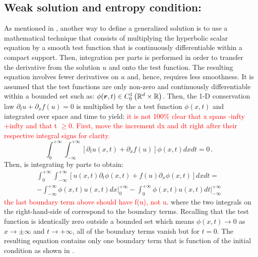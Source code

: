 \subsection{Weak solution and entropy condition:}\label{weak_sct1b}
As mentioned in , another way to define a generalized solution is to use a mathematical technique that consists of multiplying the hyperbolic scalar equation by a smooth test function that is continuously differentiable within a compact support. Then, integration per parts is performed in order to transfer the derivative from the solution $u$ and onto the test function. The resulting equation involves fewer derivatives on $u$ and, hence, requires less smoothness. It is assumed that the test functions are only non-zero and continuously differentiable within a bounded set such as: $\phi(\boldsymbol r,t) \in C_0^1 \left( \mathbb{R}^d \times \mathbb{R} \right)$. 
Then, the 1-D conservation law $\partial_t u + \partial_x f(u) = 0$ is multiplied by the a test function $\phi(x,t)$ and integrated over space and time to yield:
\textcolor{red}{it is not 100\% clear that x spans -infty +infty and that t $\ge 0$. First, move the increment dx and dt right after their respective integral signs for clarity.}%
\begin{equation}\label{eq:weak_sol_sct1b}
\int_0^{+\infty}\int_{-\infty}^{+\infty} \left[ \partial_t u(x,t) + \partial_x f(u) \right] \phi(x,t) dx dt = 0 \,.
\end{equation}
% 
Then,  is integrating by parts to obtain:
%
\begin{eqnarray}\label{eq:weak_sol2_sct1b}
\int_0^{+\infty}\int_{-\infty}^{+\infty} \left[ u(x,t) \partial_t \phi(x,t)   + f(u) \partial_x \phi(x,t)  \right] dx dt = \nonumber \\
-\int_{-\infty}^{+\infty} \phi(x,t) u(x,t) dx \left. \right|_0^{+\infty} - \int_0^{+\infty} \phi(x,t) u(x,t) dt \left. \right|_{-\infty}^{+\infty}
\end{eqnarray}
%
\textcolor{red}{the last boundary term above should have f(u), not u}.
where the two integrals on the right-hand-side of  correspond to the boundary terms. Recalling that the test function is identically zero outside a bounded set which means $\phi(x,t) \to 0$ as $x \to \pm  \infty$ and $t \to +\infty$,  all of the boundary terms vanish but for $t=0$. The resulting equation contains only one boundary term that is function of the initial condition as shown in .
